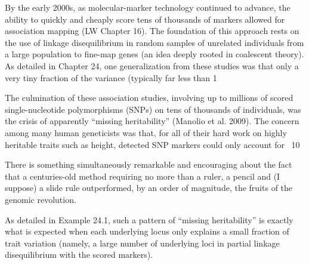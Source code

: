 \documentclass{article}
\begin{document}
By the early 2000s, as molecular-marker technology continued to advance, the ability to quickly and cheaply score tens of thousands of markers allowed for association mapping (LW Chapter 16). The foundation of this approach rests on the use of linkage disequilibrium in random samples of unrelated individuals from a large population to fine-map genes (an idea deeply rooted in coalescent theory). As detailed in Chapter 24, one generalization from these studies was that only a very tiny fraction of the variance (typically far less than 1%

The culmination of these association studies, involving up to millions of scored single-nucleotide polymorphisms (SNPs) on tens of thousands of individuals, was the crisis of apparently “missing heritability” (Manolio et al. 2009). The concern among many human geneticists was that, for all of their hard work on highly heritable traits such as height, detected SNP markers could only account for ~10%

There is something simultaneously remarkable and encouraging about the fact that a centuries-old method requiring no more than a ruler, a pencil and (I suppose) a slide rule outperformed, by an order of magnitude, the fruits of the genomic revolution.

As detailed in Example 24.1, such a pattern of “missing heritability” is exactly what is expected when each underlying locus only explains a small fraction of trait variation (namely, a large number of underlying loci in partial linkage disequilibrium with the scored markers).
\end{document}
